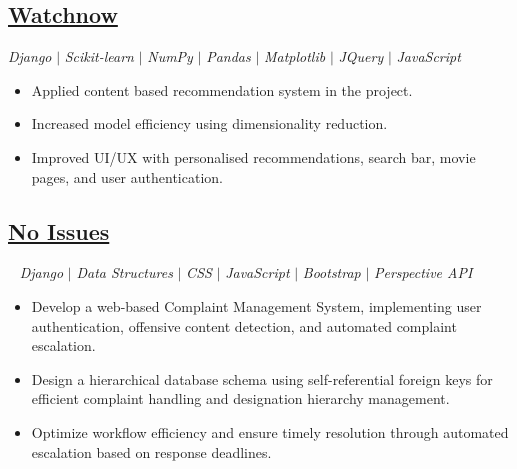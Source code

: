 \documentclass[12pt]{article}
\begin{document}
\subsection*{\href{https://github.com/prabhavagrawal7/watchnow/}{Watchnow}} \quad \small \textit{Django} $|$ \textit{Scikit-learn} $|$ \textit{NumPy} $|$ \textit{Pandas} $|$ \textit{Matplotlib} $|$ \textit{JQuery} $|$ \textit{JavaScript} \\
\begin{itemize}[topsep=0.7pt,itemsep=0.7pt,partopsep=0.7pt, parsep=0.7pt]
	\footnotesize
	\item Applied content based recommendation system in the project.
	\item Increased model efficiency using dimensionality reduction.
	\item Improved UI/UX with personalised recommendations, search bar, movie pages, and user authentication.
\end{itemize}
\vspace*{-6px}
\subsection*{\href{https://github.com/Akanksha2403/no_issues}{No Issues}}~ \quad \small \textit{Django} $\vert$ \textit{Data Structures} $\vert$ \textit{CSS} $\vert$ \textit{JavaScript} $\vert$ \textit{Bootstrap} $\vert$ \textit{Perspective API}\\ \small
\begin{itemize}[topsep=0.7pt,itemsep=0.7pt,partopsep=0.7pt, parsep=0.7pt]
	\footnotesize
	\item Develop a web-based Complaint Management System, implementing user authentication, offensive content detection, and automated complaint escalation.
	\item Design a hierarchical database schema using self-referential foreign keys for efficient complaint handling and designation hierarchy management.
	\item Optimize workflow efficiency and ensure timely resolution through automated escalation based on response deadlines.
\end{itemize}
\end{document}
